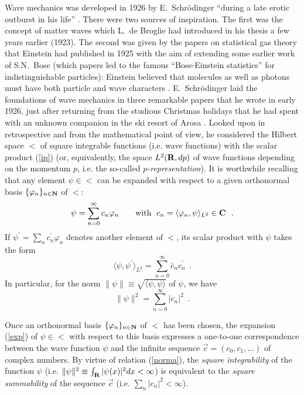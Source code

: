 \documentclass[a4wide,12pt]{report}
\begin{document}
Wave mechanics was developed in 1926 by E.~Schr\"odinger
``during a late erotic outburst in his life''  \cite{pais,moore}. 
There were two sources of 
inspiration. The first was the concept of matter waves which 
L.~de Broglie had introduced in his thesis 
a few years earlier (1923). The second was given by the papers
 on statistical gas theory that 
Einstein had published in 1925 with the aim of extending 
some earlier work 
of S.N.~Bose (which papers led to the famous 
``Bose-Einstein statistics'' for indistinguishable 
particles):
Einstein believed that molecules as well as photons must 
have both particle and wave characters \cite{moore}.
E.~Schr\"odinger laid the foundations of wave mechanics 
in three remarkable papers
that he wrote 
in early 1926, just after returning from 
the studious Christmas holidays 
that he had spent with an unknown companion in  
the ski resort of Arosa \cite{moore}.    
Looked upon in retrospective and 
from the mathematical point of view, 
he considered the Hilbert space $\lt$
of square integrable functions (i.e. wave
functions) with the scalar product (\ref{ip}) 
(or, equivalently, the space 
$L^2 ({\bf R}, dp)$ of wave functions depending on the momentum
$p$, i.e. the so-called {\em $p$-representation}). 
It is worthwhile recalling that 
any element $\psi \in \lt$ can be expanded with respect 
to a given orthonormal basis 
 $\{ \varphi_n \} _{n\in {\bf N}}$ of $\lt$:
\begin{equation}
\label{exp}
\psi = \sum_{n =0}^{\infty} c_n  \varphi_n  
\qquad {\rm with} \ \;
c_n = \langle \varphi_n , \psi \rangle _{L^2} \in {\bf C} 
\ \ .
\end{equation}
If $\psi^{\prime} = \sum_{n} c_n^{\prime}  \varphi_n$ 
denotes another element of  $\lt$, its scalar product
with $\psi$ takes the form 
\begin{equation}  
\label{exun}
\langle \psi , \psi^{\prime} \rangle _{L^2}
= \sum _{n  =0}^{\infty} \bar c_n c_n ^{\prime}
\ \ .
\end{equation}
In particular, for the norm $\| \psi \| 
\equiv \sqrt{\langle \psi , \psi \rangle}$ of $\psi$, 
we have 
\begin{equation}  
\label{norma} 
\| \psi \| ^2 = 
\sum _{n  =0}^{\infty} | c_n | ^2 
\ \ .
\end{equation}    
 

 

\medskip 

Once an orthonormal basis  
$\{ \varphi_n \} _{n\in {\bf N}}$ of $\lt$ has been chosen, 
the expansion (\ref{exp}) of $\psi \in \lt$ 
with respect to this basis  
expresses a one-to-one correspondence between the 
wave function $\psi$ and the infinite sequence  
$\vec c = (c_0, c_1,...)$ of complex numbers.
By virtue of relation (\ref{norma}), 
the {\em square integrability} of the function $\psi$ 
(i.e. $\| \psi \|^2 \equiv \int_{{\bf R}} | \psi (x)|^2 dx 
< \infty$) 
is equivalent 
to the {\em square summability} of the sequence $\vec c$
(i.e. $\sum_n | c_n |^2 < \infty$).  
\end{document}
